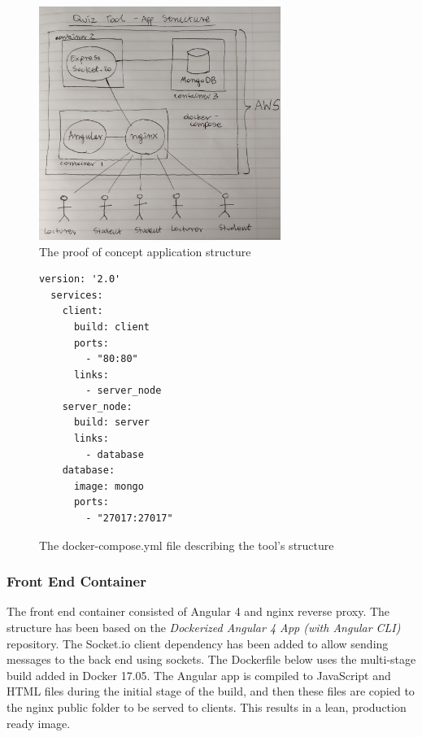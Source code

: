\begin{figure}[ht]
    \centering
    \includegraphics[width=0.7\textwidth]{../../design/app_structure.jpg}
    \caption{The proof of concept application structure}
    \label{fig:appstrucure}
\end{figure}

\begin{figure}[h!]
  \begin{lstlisting}[basicstyle=\small]
  version: '2.0'
  services:
    client:
      build: client
      ports:
        - "80:80"
      links:
        - server_node
    server_node:
      build: server
      links:
        - database
    database:
      image: mongo
      ports:
        - "27017:27017"
  \end{lstlisting}
  \caption{The docker-compose.yml file describing the tool's structure}
\end{figure}

\newpage
\subsubsection{Front End Container}
The front end container consisted of Angular 4 and nginx reverse proxy. The structure
has been based on the \textit{Dockerized Angular 4 App (with Angular CLI)} repository\cite{35}.
The Socket.io client dependency has been added to allow sending messages to the back end
using sockets. The Dockerfile below uses the multi-stage build added in Docker 17.05. The
Angular app is compiled to JavaScript and HTML files during the initial stage of the build,
and then these files are copied to the nginx public folder to be served to clients.
This results in a lean, production ready image.

